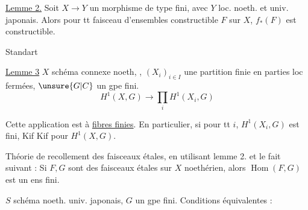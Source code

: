 
\uline{Lemme 2.} Soit $X\longrightarrow Y$ un morphisme de type fini, avec $Y$ loc. noeth. et univ. japonais. Alors pour tt faisceau d'ensembles constructible $F$ sur $X$, $f_*(F)$ est constructible.

Standart

\uline{Lemme 3} $X$ schéma connexe  noeth, , $(X_i)_{i\in I}$ une partition finie en parties loc fermées, $\unsure{G|C}$ un gpe fini.  
\[
H^1(X,G)\longrightarrow\prod_i H^1(X_i,G)
\]

Cette application est à \uline{fibres finies}. En particulier, si pour tt $i$, $H^1(X_i,G)$ est fini, Kif Kif pour $H^1(X,G)$.

Théorie de recollement des faisceaux étales, en utilisant lemme 2. et le fait suivant :
 Si $F,G$ sont des faisceaux  étales  sur $X$ noethérien, alors $\operatorname{Hom}(F,G)$ est un ens fini.
\margin{$\big|$}

   $S$  schéma noeth. univ. japonais, $G$ un gpe fini. Conditions équivalentes :
